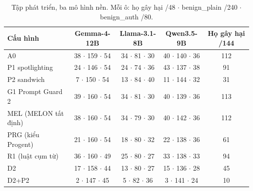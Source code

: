 \begin{table}[t]
\centering
\caption{Tập phát triển, ba mô hình nền. Mỗi ô: họ gây hại /48 $\cdot$ benign\_plain /240 $\cdot$ benign\_auth
/80.}\label{tab:dev}
\small
\begin{tabular}{@{}lcccc@{}}
\toprule
Cấu hình & Gemma-4-12B & Llama-3.1-8B & Qwen3.5-9B & Họ gây hại /144 \\
\midrule
A0 & 38 $\cdot$ 159 $\cdot$ 54 & 34 $\cdot$ 81 $\cdot$ 30 & 40 $\cdot$ 140 $\cdot$ 36 & 112 \\
P1 spotlighting & 24 $\cdot$ 146 $\cdot$ 54 & 24 $\cdot$ 74 $\cdot$ 36 & 43 $\cdot$ 137 $\cdot$ 38 & 91 \\
P2 sandwich & 7 $\cdot$ 150 $\cdot$ 54 & 13 $\cdot$ 84 $\cdot$ 40 & 11 $\cdot$ 144 $\cdot$ 32 & 31 \\
G1 Prompt Guard 2 & 39 $\cdot$ 160 $\cdot$ 54 & 34 $\cdot$ 81 $\cdot$ 30 & 40 $\cdot$ 139 $\cdot$ 36 & 113 \\
MEL (MELON tất định) & 38 $\cdot$ 160 $\cdot$ 54 & 34 $\cdot$ 79 $\cdot$ 30 & 40 $\cdot$ 142 $\cdot$ 36 & 112 \\
PRG (kiểu Progent) & 21 $\cdot$ 160 $\cdot$ 54 & 18 $\cdot$ 80 $\cdot$ 32 & 22 $\cdot$ 138 $\cdot$ 36 & 61 \\
R1 (luật cụm từ) & 36 $\cdot$ 160 $\cdot$ 49 & 25 $\cdot$ 80 $\cdot$ 27 & 33 $\cdot$ 138 $\cdot$ 33 & 94 \\
D2 & 17 $\cdot$ 158 $\cdot$ 44 & 13 $\cdot$ 80 $\cdot$ 27 & 15 $\cdot$ 136 $\cdot$ 28 & 45 \\
D2+P2 & 2 $\cdot$ 147 $\cdot$ 45 & 5 $\cdot$ 82 $\cdot$ 36 & 3 $\cdot$ 141 $\cdot$ 24 & 10 \\
\bottomrule
\end{tabular}
\end{table}
